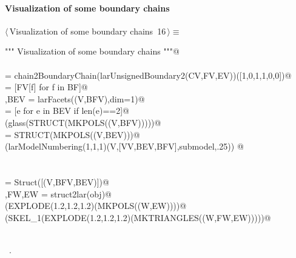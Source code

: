 \documentclass[11pt,oneside]{article}    %
\begin{document}
\paragraph{Visualization of some boundary chains}
\begin{flushleft} \small \label{scrap26}
\protect{}$\langle\,$Visualization of some boundary chains\nobreak\ {\footnotesize 16}$\,\rangle\equiv$
\vspace{-1ex}
\begin{list}{}{} \item
\mbox{}\verb@""" Visualization of some boundary chains """@\\
\mbox{}\verb@@\\
\mbox{}\verb@BF = chain2BoundaryChain(larUnsignedBoundary2(CV,FV,EV))([1,0,1,1,0,0])@\\
\mbox{}\verb@BFV = [FV[f] for f in BF]@\\
\mbox{}\verb@V,BEV = larFacets((V,BFV),dim=1)@\\
\mbox{}\verb@BEV = [e for e in BEV if len(e)==2]@\\
\mbox{}\verb@VIEW(glass(STRUCT(MKPOLS((V,BFV)))))@\\
\mbox{}\verb@submodel = STRUCT(MKPOLS((V,BEV)))@\\
\mbox{}\verb@VIEW(larModelNumbering(1,1,1)(V,[VV,BEV,BFV],submodel,.25)) @\\
\mbox{}\verb@@\\
\mbox{}\verb@@\\
\mbox{}\verb@obj = Struct([(V,BFV,BEV)])@\\
\mbox{}\verb@W,FW,EW = struct2lar(obj)@\\
\mbox{}\verb@VIEW(EXPLODE(1.2,1.2,1.2)(MKPOLS((W,EW))))@\\
\mbox{}\verb@VIEW(SKEL_1(EXPLODE(1.2,1.2,1.2)(MKTRIANGLES((W,FW,EW)))))@\\
\mbox{}\verb@@\\
\mbox{}\verb@@{\NWsep}
\end{list}
\vspace{-1ex}
\footnotesize\addtolength{\baselineskip}{-1ex}
\begin{list}{}{\setlength{\itemsep}{-\parsep}\setlength{\itemindent}{-\leftmargin}}
\item \NWtxtMacroRefIn\ .
\end{list}
\end{flushleft}
\end{document}
